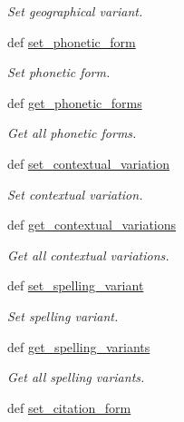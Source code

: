 \begin{DoxyCompactItemize}
\begin{DoxyCompactList}\small\item\em Set geographical variant. \end{DoxyCompactList}\item 
def \hyperlink{classlmf_1_1src_1_1morphology_1_1lemma_1_1_lemma_ae14b90791332a8d5522ac5056ae2842f}{set\+\_\+phonetic\+\_\+form}
\begin{DoxyCompactList}\small\item\em Set phonetic form. \end{DoxyCompactList}\item 
def \hyperlink{classlmf_1_1src_1_1morphology_1_1lemma_1_1_lemma_af0a2868094d8121b389138319034f164}{get\+\_\+phonetic\+\_\+forms}
\begin{DoxyCompactList}\small\item\em Get all phonetic forms. \end{DoxyCompactList}\item 
def \hyperlink{classlmf_1_1src_1_1morphology_1_1lemma_1_1_lemma_a9f80f34789351b4d3b55c344acb19562}{set\+\_\+contextual\+\_\+variation}
\begin{DoxyCompactList}\small\item\em Set contextual variation. \end{DoxyCompactList}\item 
def \hyperlink{classlmf_1_1src_1_1morphology_1_1lemma_1_1_lemma_a54b9c3f2ae876fdb93b4c4676403c1f0}{get\+\_\+contextual\+\_\+variations}
\begin{DoxyCompactList}\small\item\em Get all contextual variations. \end{DoxyCompactList}\item 
def \hyperlink{classlmf_1_1src_1_1morphology_1_1lemma_1_1_lemma_a01bba6d5da1c9c0d70a3faf762d24f7c}{set\+\_\+spelling\+\_\+variant}
\begin{DoxyCompactList}\small\item\em Set spelling variant. \end{DoxyCompactList}\item 
def \hyperlink{classlmf_1_1src_1_1morphology_1_1lemma_1_1_lemma_a13fb86a829741554939046f500409327}{get\+\_\+spelling\+\_\+variants}
\begin{DoxyCompactList}\small\item\em Get all spelling variants. \end{DoxyCompactList}\item 
def \hyperlink{classlmf_1_1src_1_1morphology_1_1lemma_1_1_lemma_a349b6a8d0a6a571933cd2bede36f695b}{set\+\_\+citation\+\_\+form}

\end{DoxyCompactItemize}
